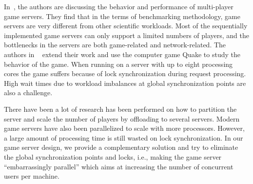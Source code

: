 
In~\cite{Abdelkhalek2003++}, the authors are discussing the behavior
and performance of multi-player game servers. They find that in the
terms of benchmarking methodology, game servers are very different
from other scientific workloads. Most of the sequentially implemented
game servers can only support a limited numbers of players, and the
bottlenecks in the servers are both game-related and
network-related. The authors in ~\cite{Abdelkhalek2004++} extend their
work and use the computer game Quake to study the behavior of the game. When
running on a server with up to eight processing cores the game suffers
because of lock synchronization during request processing. High wait
times due to workload imbalances at global synchronization points are
also a challenge.

There have been a lot of research has been performed on
how to partition the server and scale the number of players by
offloading to several servers.  Modern game servers have also been
parallelized to scale with more processors. However, a large amount of
processing time is still wasted on lock synchronization. In our game
server design, we provide a complementary solution and try to
eliminate the global synchronization points and locks, i.e., making the
game server ``embarrassingly parallel'' which aims at
increasing the number of concurrent users per machine.

